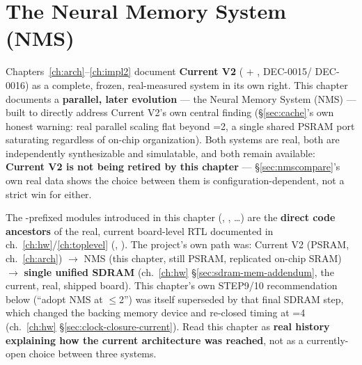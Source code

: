 \chapter{The Neural Memory System (NMS)}
\label{ch:nms}

\begin{fnnote}
Chapters~\ref{ch:arch}--\ref{ch:impl2} document \textbf{Current V2}
( + , DEC-0015/
DEC-0016) as a complete, frozen, real-measured system in its own
right. This chapter documents a \textbf{parallel, later evolution} ---
the Neural Memory System (NMS) --- built to directly address Current
V2's own central finding (\S\ref{sec:cache}'s own honest warning:
real parallel scaling flat beyond =2, a single shared
PSRAM port saturating regardless of on-chip organization). Both
systems are real, both are independently synthesizable and
simulatable, and both remain available: \textbf{Current V2 is not
being retired by this chapter} --- \S\ref{sec:nmscompare}'s own real
data shows the choice between them is configuration-dependent, not a
strict win for either.
\end{fnnote}

\begin{fnwarn}
The -prefixed modules introduced in this chapter
(, ,
\ldots) are the \textbf{direct code ancestors} of the real, current
board-level RTL documented in ch.~\ref{ch:hw}/\ref{ch:toplevel}
(, ).
The project's own path was: Current V2 (PSRAM, ch.~\ref{ch:arch}) $\to$
NMS (this chapter, still PSRAM, replicated on-chip SRAM) $\to$
\textbf{single unified SDRAM} (ch.~\ref{ch:hw}
\S\ref{sec:sdram-mem-addendum}, the current, real, shipped board). This
chapter's own STEP9/10 recommendation below (``adopt NMS at
$\le$2'') was itself superseded by that final SDRAM
step, which changed the backing memory device and re-closed timing at
=4 (ch.~\ref{ch:hw} \S\ref{sec:clock-closure-current}).
Read this chapter as \textbf{real history explaining how the current
architecture was reached}, not as a currently-open choice between three
systems.
\end{fnwarn}

